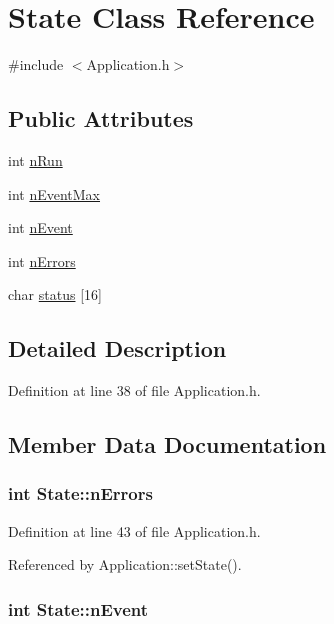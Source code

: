 \hypertarget{classState}{
\section{State Class Reference}
\label{classState}
}


{\ttfamily \#include $<$Application.h$>$}\subsection*{Public Attributes}
\begin{DoxyCompactItemize}
\item 
int \hyperlink{classState_aa29a124a8d6060a02bd2468480d7bbd3}{nRun}
\item 
int \hyperlink{classState_ac57f536cfe9e9819dfc891ed00dabfe3}{nEventMax}
\item 
int \hyperlink{classState_af9d335bba28d6946043a07b047556690}{nEvent}
\item 
int \hyperlink{classState_a0dc7f2525107b9b294f50c23da27cc2a}{nErrors}
\item 
char \hyperlink{classState_aaec062c78d5602d066a7960a2e08e1cd}{status} \mbox{[}16\mbox{]}
\end{DoxyCompactItemize}


\subsection{Detailed Description}


Definition at line 38 of file Application.h.

\subsection{Member Data Documentation}
\hypertarget{classState_a0dc7f2525107b9b294f50c23da27cc2a}{
\subsubsection[{nErrors}]{\setlength{\rightskip}{0pt plus 5cm}int {\bf State::nErrors}}}
\label{classState_a0dc7f2525107b9b294f50c23da27cc2a}


Definition at line 43 of file Application.h.

Referenced by Application::setState().\hypertarget{classState_af9d335bba28d6946043a07b047556690}{
\subsubsection[{nEvent}]{\setlength{\rightskip}{0pt plus 5cm}int {\bf State::nEvent}}}
\label{classState_af9d335bba28d6946043a07b047556690}


